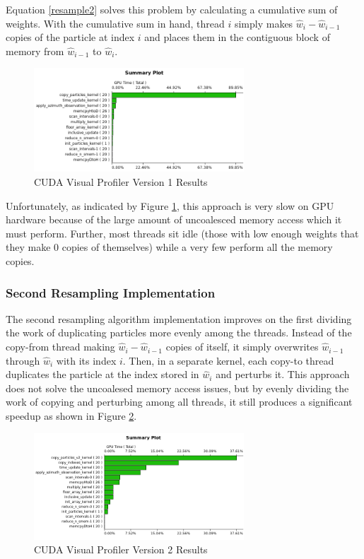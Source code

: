 \documentclass{article}
\begin{document}
Equation \ref{resample2} solves this problem by calculating a cumulative sum of weights. With the cumulative sum in hand, thread \(i\) simply makes \(\hat{w}_{i}-\hat{w}_{i-1}\) copies of the particle at index \(i\) and places them in the contiguous block of memory from \(\hat{w}_{i-1}\) to \(\hat{w}_{i}\).

\begin{figure}
\centering
\includegraphics[width=0.7\textwidth]{data/profile_cuda_version1_pic1.png}
\caption{CUDA Visual Profiler Version 1 Results}
\label{profiler1}
\end{figure}

Unfortunately, as indicated by Figure \ref{profiler1}, this approach is very slow on GPU hardware because of the large amount of uncoalesced memory access which it must perform. Further, most threads sit idle (those with low enough weights that they make 0 copies of themselves) while a very few perform all the memory copies.

\subsubsection{Second Resampling Implementation}\label{resamplesection2}

The second resampling algorithm implementation improves on the first dividing the work of duplicating particles more evenly among the threads. Instead of the copy-from thread making \(\hat{w}_{i}-\hat{w}_{i-1}\) copies of itself, it simply overwrites \(\hat{w}_{i-1}\) through \(\hat{w}_{i}\) with its index \(i\). Then, in a separate kernel, each copy-to thread duplicates the particle at the index stored in \(\hat{w}_{i}\) and perturbs it. This approach does not solve the uncoalesed memory access issues, but by evenly dividing the work of copying and perturbing among all threads, it still produces a significant speedup as shown in Figure \ref{profiler2}.

\begin{figure}
\centering
\includegraphics[width=0.7\textwidth]{data/profile_cuda_version2_pic1.png}
\caption{CUDA Visual Profiler Version 2 Results}
\label{profiler2}
\end{figure}
\end{document}
